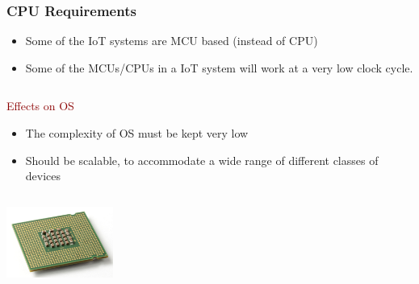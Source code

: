 \documentclass{beamer}
\begin{document}
\begin{frame}
	\frametitle{CPU Requirements}
	\begin{itemize}
		\justifying
		\item Some of the IoT systems are MCU based (instead of CPU)
		\item Some of the MCUs/CPUs in a IoT system will work at a very low clock cycle.
	\end{itemize}

	\begin{columns}
	\begin{block}{\centering\textcolor{darkred}{Effects on OS}}
		\justifying
		\begin{itemize}
			\item The complexity of OS must be kept very low
			\item Should be scalable, to accommodate a wide range of different classes of devices
		\end{itemize}
	\end{block}
	\end{columns}
	
	\vspace{0.5cm}
	\hspace*{7cm} \includegraphics[width=3.5cm]{figs/CPU.jpg}
\end{frame}
\end{document}
